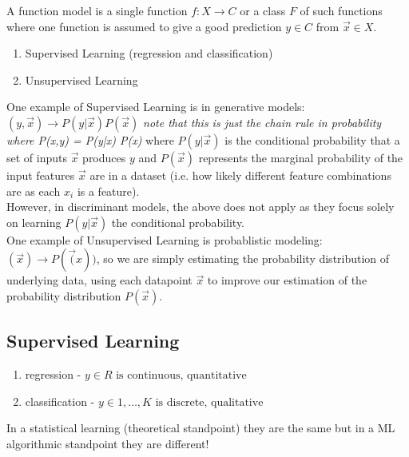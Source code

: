 \documentclass[a4paper]{article}
\begin{document}
  \begin{definition}
    A function model is a single function $f: X \to C$ or a class $F$ of such functions where one function is assumed to give a good 
    prediction $y \in C$ from $\vec{x} \in X$.
  \end{definition}
  
  \begin{enumerate}
    \item Supervised Learning (regression and classification)
    \item Unsupervised Learning
  \end{enumerate}

  \begin{remark}
    One example of Supervised Learning is in generative models: $(y, \vec{x}) \to P(y | \vec{x}) P(\vec{x})$ \textit{note that this is 
    just the chain rule in probability where P(x,y) = P(y|x) P(x)} where $P(y | \vec{x})$ is the 
    conditional probability that a set of inputs $\vec{x}$ produces $y$ and $P(\vec{x})$ represents the marginal probability of the
    input features $\vec{x}$ are in a dataset (i.e. how likely different feature combinations are as each $x_i$ is a feature). \\

    However, in discriminant models, the above does not apply as they focus solely on learning $P(y | \vec{x})$ the conditional
    probability. \\
  
    One example of Unsupervised Learning is probablistic modeling: $(\vec{x}) \to P(\vec(x))$, so we are simply estimating the probability 
    distribution of underlying data, using each datapoint $\vec{x}$ to improve our estimation of the probability distribution $P(\vec{x})$.
  \end{remark}
  
  \subsection{Supervised Learning} 
  \begin{enumerate}
    \item regression - $y \in R \text{ is continuous, quantitative}$ 
    \item classification - $y \in {1, \ldots , K} \text{ is discrete, qualitative}$
  \end{enumerate}
  In a statistical learning (theoretical standpoint) they are the same but in a ML algorithmic standpoint they are different!
  
\end{document}
